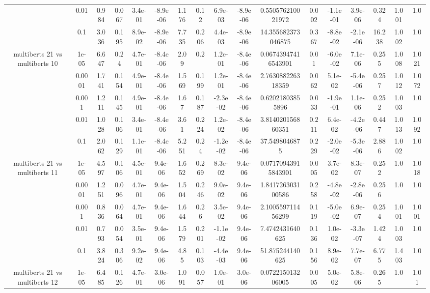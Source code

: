 \begin{tabular}{|c|c|c|c|c|c|c|c|c|c|c|c|c|c|c|c|c|}
 & 0.01 & 0.984 & 0.067 & 3.4e-01 & -8.9e-06 & 1.176 & 0.12 & 6.9e-03 & -8.9e-06 & 0.550576210021972 & 0.002 & -1.1e-01 & 3.9e-06 & 0.324 & 1.001 & 1.0 \\
 & 0.1 & 3.036 & 0.195 & 8.9e-02 & -8.9e-06 & 7.735 & 0.206 & 4.4e-03 & -8.9e-06 & 14.355682373046875 & 0.367 & -8.8e-02 & -2.1e-06 & 16.238 & 1.002 & 1.0 \\
\hline
\multirow{5}{*}{multiberts 21 vs multiberts 10} & 1e-05 & 6.647 & 0.24 & 4.7e-01 & -8.4e-06 & 2.09 & 0.2 & 1.2e-01 & -8.4e-06 & 0.06743947416543901 & 0.01 & -6.0e-02 & 7.1e-06 & 0.255 & 1.008 & 1.021 \\
 & 0.0001 & 1.741 & 0.154 & 4.9e-01 & -8.4e-06 & 1.569 & 0.199 & 1.2e-01 & -8.4e-06 & 2.763088226318359 & 0.062 & 5.1e-02 & -5.4e-06 & 0.257 & 1.012 & 1.072 \\
 & 0.001 & 1.211 & 0.145 & 4.9e-01 & -8.4e-06 & 1.67 & 0.187 & -2.3e-02 & -8.4e-06 & 0.62021803855896 & 0.033 & -1.9e-01 & 1.1e-06 & 0.252 & 1.003 & 1.0 \\
 & 0.01 & 1.028 & 0.106 & 3.4e-01 & -8.4e-06 & 3.61 & 0.224 & 1.2e-02 & -8.4e-06 & 3.814020156860351 & 0.211 & 6.4e-02 & -4.2e-06 & 0.447 & 1.013 & 1.092 \\
 & 0.1 & 2.062 & 0.129 & 1.1e-01 & -8.4e-06 & 5.251 & 0.24 & -1.2e-02 & -8.4e-06 & 37.5498046875 & 0.229 & -2.0e-02 & -5.3e-06 & 2.886 & 1.002 & 1.0 \\
\hline
\multirow{5}{*}{multiberts 21 vs multiberts 11} & 1e-05 & 4.597 & 0.106 & 4.5e-01 & 9.4e-06 & 1.652 & 0.269 & 8.3e-02 & 9.4e-06 & 0.07170943915843901 & 0.005 & 3.7e-02 & 8.3e-07 & 0.252 & 1.0 & 1.018 \\
 & 0.0001 & 1.251 & 0.096 & 4.7e-01 & 9.4e-06 & 1.504 & 0.246 & 9.0e-02 & 9.4e-06 & 1.841726303100586 & 0.258 & -4.8e-02 & -2.8e-06 & 0.256 & 1.0 & 1.0 \\
 & 0.001 & 0.836 & 0.064 & 4.7e-01 & 9.4e-06 & 1.644 & 0.26 & 3.5e-02 & 9.4e-06 & 2.100559711456299 & 0.119 & -5.0e-02 & 6.9e-07 & 0.254 & 1.001 & 1.001 \\
 & 0.01 & 0.793 & 0.054 & 3.5e-01 & 9.4e-06 & 1.579 & 0.201 & -1.1e-02 & 9.4e-06 & 7.4742431640625 & 0.136 & 1.0e-02 & -3.3e-07 & 1.424 & 1.003 & 1.0 \\
 & 0.1 & 3.824 & 0.306 & 9.2e-02 & 9.4e-06 & 4.85 & 0.103 & -4.4e-03 & 9.4e-06 & 51.875244140625 & 0.156 & 8.9e-02 & 7.7e-07 & 6.775 & 1.403 & 1.0 \\
\hline
\multirow{5}{*}{multiberts 21 vs multiberts 12} & 1e-05 & 6.485 & 0.126 & 4.7e-01 & 3.0e-06 & 1.091 & 0.057 & 1.0e-01 & 3.0e-06 & 0.072215013206005 & 0.005 & 5.0e-02 & 5.8e-06 & 0.265 & 1.0 & 1.01 \\

\end{tabular}
